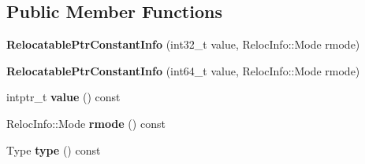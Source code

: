 \subsection*{Public Member Functions}
\begin{DoxyCompactItemize}
\item 
{\bfseries Relocatable\+Ptr\+Constant\+Info} (int32\+\_\+t value, Reloc\+Info\+::\+Mode rmode)\hypertarget{classv8_1_1internal_1_1compiler_1_1_relocatable_ptr_constant_info_ac908b7c6dba7a02fb8fb8778b41eb781}{}\label{classv8_1_1internal_1_1compiler_1_1_relocatable_ptr_constant_info_ac908b7c6dba7a02fb8fb8778b41eb781}

\item 
{\bfseries Relocatable\+Ptr\+Constant\+Info} (int64\+\_\+t value, Reloc\+Info\+::\+Mode rmode)\hypertarget{classv8_1_1internal_1_1compiler_1_1_relocatable_ptr_constant_info_a8e8fbcf5a77010576da0526be86c4ee7}{}\label{classv8_1_1internal_1_1compiler_1_1_relocatable_ptr_constant_info_a8e8fbcf5a77010576da0526be86c4ee7}

\item 
intptr\+\_\+t {\bfseries value} () const \hypertarget{classv8_1_1internal_1_1compiler_1_1_relocatable_ptr_constant_info_acd8624ec4552440cb8be7c62376a138c}{}\label{classv8_1_1internal_1_1compiler_1_1_relocatable_ptr_constant_info_acd8624ec4552440cb8be7c62376a138c}

\item 
Reloc\+Info\+::\+Mode {\bfseries rmode} () const \hypertarget{classv8_1_1internal_1_1compiler_1_1_relocatable_ptr_constant_info_a89da1867da318e67338b057954977761}{}\label{classv8_1_1internal_1_1compiler_1_1_relocatable_ptr_constant_info_a89da1867da318e67338b057954977761}

\item 
Type {\bfseries type} () const \hypertarget{classv8_1_1internal_1_1compiler_1_1_relocatable_ptr_constant_info_abcfee5dcbd104f13a920df25d1aa91d2}{}\label{classv8_1_1internal_1_1compiler_1_1_relocatable_ptr_constant_info_abcfee5dcbd104f13a920df25d1aa91d2}

\end{DoxyCompactItemize}

